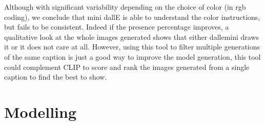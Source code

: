\documentclass{article}
\begin{document}
\begin{multicols}{2}
Although with significant variability depending on the choice of color (in rgb coding), we conclude that mini dallE is able to understand the color instructions, but fails to be consistent. Indeed if the presence percentage improves, a qualitative look at the whole images generated shows that either \gls{dallemini} draws it or it does not care at all. However, using this tool to filter multiple generations of the same caption is just a good way to improve the model generation, this tool could complement CLIP to score and rank the images generated from a single caption to find the best to show.

\end{multicols}

\section{Modelling}
\end{document}
